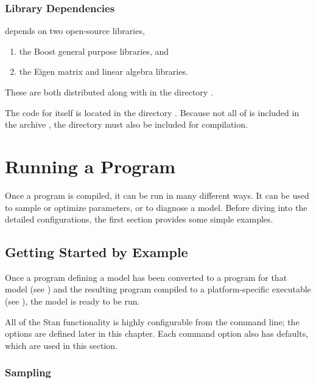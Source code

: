 \subsection{Library Dependencies}

\Stan depends on two open-source libraries,
%
\begin{enumerate}
\item the Boost general purpose \Cpp libraries, and 
\item the Eigen matrix and linear algebra \Cpp libraries.
\end{enumerate}
%
These are both distributed along with \Stan in the directory
.  

The code for \Stan itself is located in the directory
.  Because not all of \Stan is included in the
archive , the  directory must also be
included for compilation.





\chapter{Running a \Stan Program}\label{stan-cmd.chapter}

\noindent 
Once a \Stan program is compiled, it can be run in many different
ways.  It can be used to sample or optimize parameters, or to diagnose
a model.  Before diving into the detailed configurations, the first
section provides some simple examples.


\section{Getting Started by Example}\label{command-getting-started.section}

Once a \Stan program defining a model has been converted to a \Cpp
program for that model (see ) and the resulting \Cpp
program compiled to a platform-specific executable (see
), the model is ready to be run.

All of the Stan functionality is highly configurable from the command
line; the options are defined later in this chapter.  Each command
option also has defaults, which are used in this section.

\subsection{Sampling}

